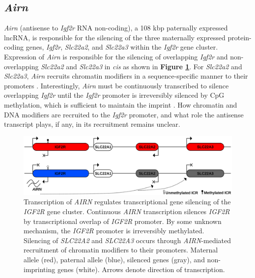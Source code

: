 {\subsection{\textit{Airn}}

\textit{Airn} (antisense to \textit{Igf2r} RNA non-coding), a 108 kbp paternally expressed lncRNA, is responsible for the silencing of the three maternally expressed protein-coding genes, \textit{Igf2r}, \textit{Slc22a2}, and \textit{Slc22a3} within the \textit{Igf2r} gene cluster. Expression of \textit{Airn} is responsible for the silencing of overlapping \textit{Igf2r} and non-overlapping \textit{Slc22a2} and \textit{Slc22a3} in \textit{cis} \cite{Sleutels2002} as shown in \textbf{Figure \ref{Figure 1-6: }}. For \textit{Slc22a2} and \textit{Slc22a3}, \textit{Airn} recruits chromatin modifiers in a sequence-specific manner to their promoters \cite{Nagano2008}. Interestingly, \textit{Airn} must be continuously transcribed to silence overlapping \textit{Igf2r} until the \textit{Igf2r} promoter is irreversibly silenced by CpG methylation, which is sufficient to maintain the imprint \cite{Latos2012,Santoro2013}. How chromatin and DNA modifiers are recruited to the \textit{Igf2r} promoter, and what role the antisense transcript plays, if any, in its recruitment remains unclear.

\begin{figure}[!ht]
\centering
\includegraphics[scale=0.45]{figures/AIRN2.pdf}
\caption{Transcription of \emph{AIRN} regulates transcriptional gene silencing of the \emph{IGF2R} gene cluster. Continuous \emph{AIRN} transcription silences \emph{IGF2R} by transcriptional overlap of \emph{IGF2R} promoter. By some unknown mechanism, the \emph{IGF2R} promoter is irreversibly methylated. Silencing of \emph{SLC22A2} and \emph{SLC22A3} occurs through \emph{AIRN}-mediated recruitment of chromatin modifiers to their promoters. Maternal allele (red), paternal allele (blue), silenced genes (gray), and non-imprinting genes (white). Arrows denote direction of transcription.}
\label{Figure 1-6: }
\end{figure}

}
